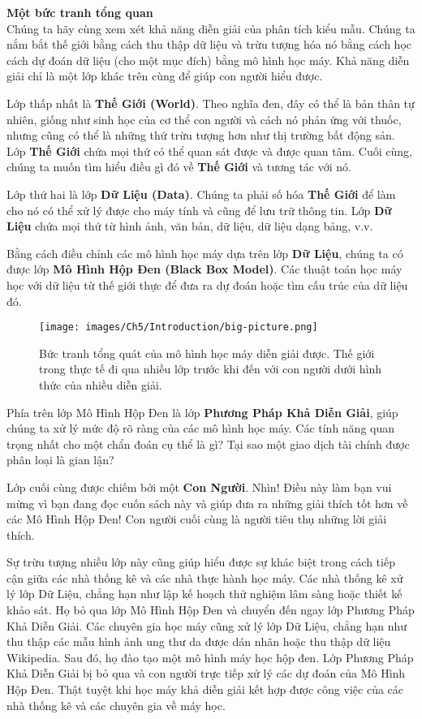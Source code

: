 \textbf{Một bức tranh tổng quan} 
~\\
Chúng ta hãy cùng xem xét khả năng diễn giải của phân tích kiểu mẫu. Chúng ta nắm bắt thế giới bằng cách thu thập dữ liệu và trừu tượng hóa nó bằng cách học cách dự đoán dữ liệu (cho một mục đích) bằng mô hình học máy. Khả năng diễn giải chỉ là một lớp khác trên cùng để giúp con người hiểu được.

Lớp thấp nhất là \textbf{Thế Giới (World)}. Theo nghĩa đen, đây có thể là bản thân tự nhiên, giống như sinh học của cơ thể con người và cách nó phản ứng với thuốc, nhưng cũng có thể là những thứ trừu tượng hơn như thị trường bất động sản. Lớp \textbf{Thế Giới} chứa mọi thứ có thể quan sát được và được quan tâm. Cuối cùng, chúng ta muốn tìm hiểu điều gì đó về \textbf{Thế Giới} và tương tác với nó.

Lớp thứ hai là lớp \textbf{Dữ Liệu (Data)}. Chúng ta phải số hóa \textbf{Thế Giới} để làm cho nó có thể xử lý được cho máy tính và cũng để lưu trữ thông tin. Lớp \textbf{Dữ Liệu} chứa mọi thứ từ hình ảnh, văn bản, dữ liệu, dữ liệu dạng bảng, v.v.

Bằng cách điều chỉnh các mô hình học máy dựa trên lớp \textbf{Dữ Liệu}, chúng ta có được lớp \textbf{Mô Hình Hộp Đen (Black Box Model)}. Các thuật toán học máy học với dữ liệu từ thế giới thực để đưa ra dự đoán hoặc tìm cấu trúc của dữ liệu đó.

\begin{figure*}[h!]
	\centering
	\texttt{[image: images/Ch5/Introduction/big-picture.png]}
	\label{fig:5_1}
	\caption{Bức tranh tổng quát của mô hình học máy diễn giải được. Thế giới trong thực tế đi qua nhiều lớp trước khi đến với con người dưới hình thức của nhiều diễn giải.}
\end{figure*}

Phía trên lớp Mô Hình Hộp Đen là lớp \textbf{Phương Pháp Khả Diễn Giải}, giúp chúng ta xử lý mức độ rõ ràng của các mô hình học máy. Các tính năng quan trọng nhất cho một chẩn đoán cụ thể là gì? Tại sao một giao dịch tài chính được phân loại là gian lận?

Lớp cuối cùng được chiếm bởi một \textbf{Con Người}. Nhìn! Điều này làm bạn vui mừng vì bạn đang đọc cuốn sách này và giúp đưa ra những giải thích tốt hơn về các Mô Hình Hộp Đen! Con người cuối cùng là người tiêu thụ những lời giải thích.

Sự trừu tượng nhiều lớp này cũng giúp hiểu được sự khác biệt trong cách tiếp cận giữa các nhà thống kê và các nhà thực hành học máy. Các nhà thống kê xử lý lớp Dữ Liệu, chẳng hạn như lập kế hoạch thử nghiệm lâm sàng hoặc thiết kế khảo sát. Họ bỏ qua lớp Mô Hình Hộp Đen và chuyển đến ngay lớp Phương Pháp Khả Diễn Giải. Các chuyên gia học máy cũng xử lý lớp Dữ Liệu, chẳng hạn như thu thập các mẫu hình ảnh ung thư da được dán nhãn hoặc thu thập dữ liệu Wikipedia. Sau đó, họ đào tạo một mô hình máy học hộp đen. Lớp Phương Pháp Khả Diễn Giải bị bỏ qua và con người trực tiếp xử lý các dự đoán của Mô Hình Hộp Đen. Thật tuyệt khi học máy khả diễn giải kết hợp được công việc của các nhà thống kê và các chuyên gia về máy học.


